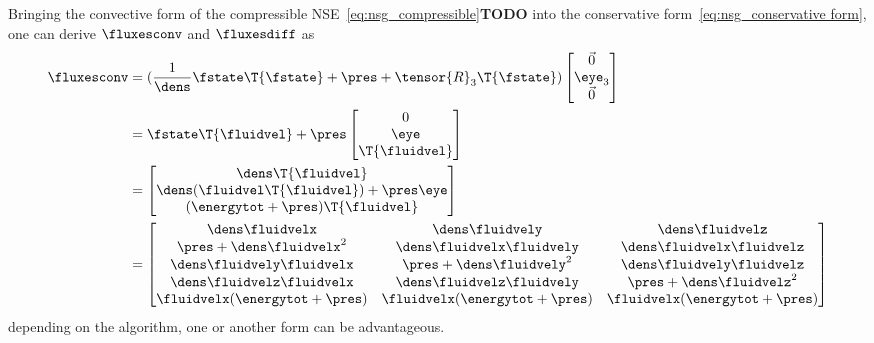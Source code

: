 \documentclass[../main.tex]{subfiles}
\begin{document}
Bringing the convective form of the compressible \ac{NSE}~\eqref{eq:nsg_compressible}\textbf{TODO} into the conservative form~\eqref{eq:nsg_conservative form}, one can derive $\fluxesconv$ and $\fluxesdiff$ as
\begin{align}\label{eq:fluxesconv}
\fluxesconv&=
(\frac{1}{\dens} \fstate \T{\fstate} + \pres + \tensor{R}_3 \T{\fstate})
\begin{bmatrix}
\vec{0} \\ \eye_{3} \\ \vec{0}
\end{bmatrix} \\ %
&=
\fstate \T{\fluidvel} + \pres
\begin{bmatrix}
0\\ \eye \\ \T{\fluidvel}
\end{bmatrix} \\
  &=
	\begin{bmatrix}
	  \dens \T{\fluidvel} \\
	  \dens(\fluidvel \T{\fluidvel} ) + \pres \eye \\
	  (\energytot+\pres) \T{\fluidvel}
	\end{bmatrix} \\
	  &=
	  \begin{bmatrix}
	  \dens \fluidvelx             &  \dens\fluidvely              &  \dens\fluidvelz             \\
	  \pres+\dens\fluidvelx^{2}    &  \dens\fluidvelx\fluidvely    &  \dens\fluidvelx\fluidvelz   \\
	  \dens\fluidvely\fluidvelx    &  \pres+\dens\fluidvely^{2}    &  \dens\fluidvely\fluidvelz   \\
	  \dens\fluidvelz\fluidvelx    &  \dens\fluidvelz\fluidvely    &  \pres+\dens\fluidvelz^{2}   \\
	  \fluidvelx(\energytot+\pres) &  \fluidvelx(\energytot+\pres) & \fluidvelx(\energytot+\pres) \\
	  \end{bmatrix}
\end{align}
depending on the algorithm, one or another form can be advantageous.
\end{document}
